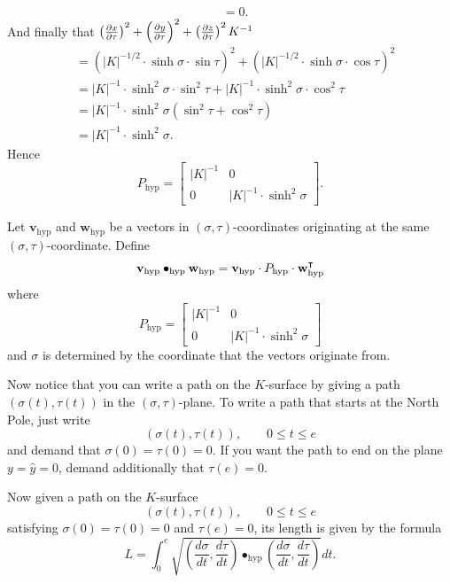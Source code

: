 \documentclass[newpage,hints,handout]{ximera}
\begin{document}
\begin{problem}
\begin{freeResponse}
\begin{align*}
      &= 0.
    \end{align*}
    And finally that $\left(\pp[x]{\tau}\right)^2 + \left(\pp[y]{\tau}\right)^2 + \left(\pp[z]{\tau}\right)^2K^{-1}$
     \begin{align*}
       &= \left(|K|^{-1/2}\cdot \sinh\sigma\cdot \sin \tau \right)^2 + \left( |K|^{-1/2}\cdot \sinh\sigma\cdot \cos\tau \right)^2 \\
       &= |K|^{-1}\cdot \sinh^2\sigma\cdot \sin^2 \tau + |K|^{-1}\cdot \sinh^2\sigma\cdot \cos^2\tau \\
       &= |K|^{-1}\cdot \sinh^2\sigma\left(\sin^2 \tau + \cos^2\tau\right) \\
       &= |K|^{-1}\cdot \sinh^2\sigma.
     \end{align*}
     Hence
     \[
     P_\mathrm{hyp} =
  \begin{bmatrix}
    |K|^{-1} & 0 \\
    0 & |K|^{-1}\cdot\sinh^2 \sigma
  \end{bmatrix}.
     \]
  \end{freeResponse}
\end{problem}



\begin{definition}
  Let $\mathbf{v}_\mathrm{hyp}$ and $\mathbf{w}_\mathrm{hyp}$ be a vectors in
  $(\sigma,\tau)$-coordinates originating at the same
  $(\sigma,\tau)$-coordinate. Define
  \[
  \mathbf{v}_\mathrm{hyp} \bullet_\mathrm{hyp} \mathbf{w}_\mathrm{hyp} = \mathbf{v}_\mathrm{hyp} \cdot P_\mathrm{hyp} \cdot \mathbf{w}_\mathrm{hyp}^\transpose
  \]
  where
  \[
     P_\mathrm{hyp} =
  \begin{bmatrix}
    |K|^{-1} & 0 \\
    0 & |K|^{-1}\cdot\sinh^2 \sigma
  \end{bmatrix}
  \]
  and $\sigma$ is determined by the coordinate that the vectors
  originate from.
\end{definition}



Now notice that you can write a path on the $K$-surface by giving a path
$\left( \sigma(t),\tau(t)\right)$ in the $(\sigma,\tau)$-plane.  To write a path
that starts at the North Pole, just write%
\[
\left(\sigma(t),\tau(t)\right), \qquad 0\leq t \leq e
\]
and demand that $\sigma(0)=\tau(0) =0$.  If you want the path to end on the plane
$y=\hat{y}=0$, demand additionally that $\tau(e)=0.$


 Now given a path on the $K$-surface
 \[
 \left(\sigma(t),\tau(t)\right),\qquad 0 \leq t \leq e
 \]
 satisfying $\sigma(0)=\tau(0)=0$ and $\tau(e)=0$, its length is given by the
 formula%
 \begin{equation} \label{length}\tag{$*$}
   L=\int_{0}^e \sqrt{\left(\frac{d\sigma}{dt},\frac{d\tau}{dt}\right)
     \bullet_\mathrm{hyp} \left(\frac{d\sigma}{dt},\frac{d\tau}{dt}\right)}dt.
 \end{equation}
\end{document}
